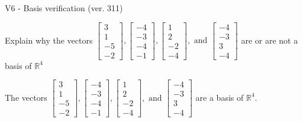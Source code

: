 \begin{exercise}
  \begin{exerciseTitle}V6 - Basis verification (ver. 311)\end{exerciseTitle}
  \begin{exerciseStatement}
    Explain why the vectors \(\left[\begin{array}{r}
3 \\
1 \\
-5 \\
-2
\end{array}\right] , \left[\begin{array}{r}
-4 \\
-3 \\
-4 \\
-1
\end{array}\right] , \left[\begin{array}{r}
1 \\
2 \\
-2 \\
-4
\end{array}\right] , \text{ and } \left[\begin{array}{r}
-4 \\
-3 \\
3 \\
-4
\end{array}\right]\) are or are not a basis of \(\mathbb{R}^4\)	


  \end{exerciseStatement}
  \begin{exerciseAnswer}
   The vectors \(\left[\begin{array}{r}
3 \\
1 \\
-5 \\
-2
\end{array}\right] , \left[\begin{array}{r}
-4 \\
-3 \\
-4 \\
-1
\end{array}\right] , \left[\begin{array}{r}
1 \\
2 \\
-2 \\
-4
\end{array}\right] , \text{ and } \left[\begin{array}{r}
-4 \\
-3 \\
3 \\
-4
\end{array}\right]\) 
  	 are  a basis of \(\mathbb{R}^4\).
  


  \end{exerciseAnswer}
\end{exercise}